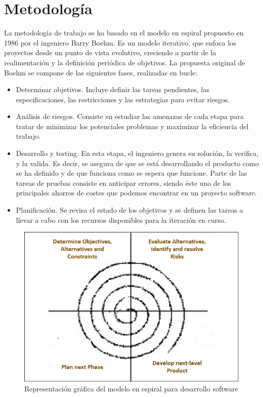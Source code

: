 \documentclass[12pt,spanish,chapterprefix, numbers=noenddot]{book}
\numberwithin{equation}{section}
\numberwithin{figure}{section}
\begin{document}
\section{Metodología}
La metodología de trabajo se ha basado en el modelo en espiral propuesto en 1986 por el ingeniero Barry Boehm. Es un modelo iterativo, que enfoca los proyectos desde un punto de vista evolutivo, creciendo a partir de la realimentación y la definición periódica de objetivos. 
La propuesta original de Boehm se compone de las siguientes fases, realizadas en bucle: 
\begin{itemize}
    \item Determinar objetivos. Incluye definir las tareas pendientes, las especificaciones, las restricciones y las estrategias para evitar riesgos.
    \item Análisis de riesgos. Consiste en estudiar las amenazas de cada etapa para tratar de minimizar los potenciales problemas y maximizar la eficiencia del trabajo. 
    \item Desarrollo y testing. En esta etapa, el ingeniero genera su solución, la verifica, y la valida. Es decir, se asegura de que se está desarrollando el producto como se ha definido y de que funciona como se espera que funcione. Parte de las tareas de pruebas consiste en anticipar errores, siendo éste uno de los principales ahorros de costes que podemos encontrar en un proyecto software. 
    \item Planificación. Se revisa el estado de los objetivos y se definen las tareas a llevar a cabo con los recursos disponibles para la iteración en curso.  
\end{itemize}

\begin{figure}[hbt!]
\centering
\includegraphics[width=12cm]{Figs/spiral_model.jpg}
\par
\caption{\label{fig:spiralModel}Representación gráfica del modelo en espiral para desarrollo software}
\end{figure}
\end{document}
